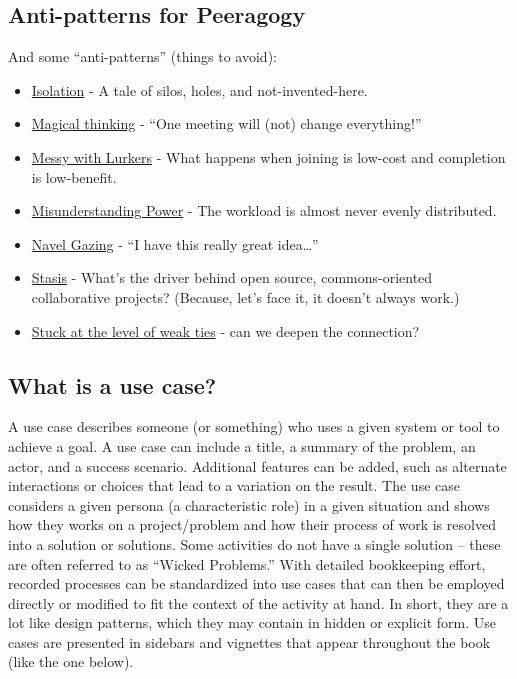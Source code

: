 \subsection{Anti-patterns for Peeragogy}

And some ``anti-patterns'' (things to avoid):

\begin{itemize}
\item
  \href{http://peeragogy.org/antipatterns/isolation/}{Isolation} - A
  tale of silos, holes, and not-invented-here.
\item
  \href{http://peeragogy.org/antipatterns/magical-thinking/}{Magical
  thinking} - ``One meeting will (not) change everything!''
\item
  \href{http://peeragogy.org/antipatterns/co-learning-messy-with-lurkers/}{Messy
  with Lurkers} - What happens when joining is low-cost and completion
  is low-benefit.
\item
  \href{http://peeragogy.org/antipatterns/misunderstanding-power/}{Misunderstanding
  Power} - The workload is almost never evenly distributed.
\item
  \href{http://peeragogy.org/antipatterns/navel-gazing/}{Navel Gazing} -
  ``I have this really great idea\ldots{}''
\item
  \href{http://peeragogy.org/antipatterns/stasis/}{Stasis} - What's the
  driver behind open source, commons-oriented collaborative projects?
  (Because, let's face it, it doesn't always work.)
\item
  \href{http://peeragogy.org/antipatterns/stuck-at-the-level-of-weak-ties/}{Stuck
  at the level of weak ties} - can we deepen the connection?
\end{itemize}
\subsection{What is a use case?}

A use case describes someone (or something) who uses a given system or
tool to achieve a goal. A use case can include a title, a summary of
the problem, an actor, and a success scenario. Additional features can
be added, such as alternate interactions or choices that lead to a
variation on the result.  The use case considers a given persona (a
characteristic role) in a given situation and shows how they works on
a project/problem and how their process of work is resolved into a
solution or solutions. Some activities do not have a single solution
-- these are often referred to as ``Wicked Problems.'' With detailed
bookkeeping effort, recorded processes can be standardized into use
cases that can then be employed directly or modified to fit the
context of the activity at hand. In short, they are a lot like design
patterns, which they may contain in hidden or explicit form. Use cases
are presented in sidebars and vignettes that appear throughout the
book (like the one below).

